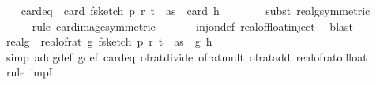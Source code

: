 \begin{isabellebody}
\isanewline
\ \ \isamarkupfalse%
\ card{\isacharunderscore}{\kern0pt}eq{\isacharcolon}{\kern0pt}\ {\isachardoublequoteopen}{\isasymAnd}{\isasymomega}{\isachardot}{\kern0pt}\ card\ {\isacharparenleft}{\kern0pt}f{}{\isacharunderscore}{\kern0pt}sketch\ p\ r\ t\ {\isasymomega}\ as{\isacharparenright}{\kern0pt}\ {\isacharequal}{\kern0pt}\ card\ {\isacharparenleft}{\kern0pt}h\ {\isasymomega}{\isacharparenright}{\kern0pt}{\isachardoublequoteclose}\ \isanewline
\ \ \ \ \isamarkupfalse%
\ {\isacharparenleft}{\kern0pt}subst\ real{\isacharunderscore}{\kern0pt}g{\isacharunderscore}{\kern0pt}{}{\isacharbrackleft}{\kern0pt}symmetric{\isacharbrackright}{\kern0pt}{\isacharparenright}{\kern0pt}\ \isanewline
\ \ \ \ \isamarkupfalse%
\ {\isacharparenleft}{\kern0pt}rule\ card{\isacharunderscore}{\kern0pt}image{\isacharbrackleft}{\kern0pt}symmetric{\isacharbrackright}{\kern0pt}{\isacharparenright}{\kern0pt}\ \isanewline
\ \ \ \ \isamarkupfalse%
\ inj{\isacharunderscore}{\kern0pt}on{\isacharunderscore}{\kern0pt}def\ real{\isacharunderscore}{\kern0pt}of{\isacharunderscore}{\kern0pt}float{\isacharunderscore}{\kern0pt}inject\ \isamarkupfalse%
\ blast\isanewline
\isanewline
\ \ \isamarkupfalse%
\ real{\isacharunderscore}{\kern0pt}g{\isacharcolon}{\kern0pt}\ {\isachardoublequoteopen}{\isasymAnd}{\isasymomega}{\isachardot}{\kern0pt}\ real{\isacharunderscore}{\kern0pt}of{\isacharunderscore}{\kern0pt}rat\ {\isacharparenleft}{\kern0pt}g\ {\isacharparenleft}{\kern0pt}f{}{\isacharunderscore}{\kern0pt}sketch\ p\ r\ t\ {\isasymomega}\ as{\isacharparenright}{\kern0pt}{\isacharparenright}{\kern0pt}\ {\isacharequal}{\kern0pt}\ g{\isacharprime}{\kern0pt}\ {\isacharparenleft}{\kern0pt}h\ {\isasymomega}{\isacharparenright}{\kern0pt}{\isachardoublequoteclose}\isanewline
\ \ \ \ \isamarkupfalse%
\ {\isacharparenleft}{\kern0pt}simp\ add{\isacharcolon}{\kern0pt}g{\isacharunderscore}{\kern0pt}def\ g{\isacharprime}{\kern0pt}{\isacharunderscore}{\kern0pt}def\ card{\isacharunderscore}{\kern0pt}eq\ of{\isacharunderscore}{\kern0pt}rat{\isacharunderscore}{\kern0pt}divide\ of{\isacharunderscore}{\kern0pt}rat{\isacharunderscore}{\kern0pt}mult\ of{\isacharunderscore}{\kern0pt}rat{\isacharunderscore}{\kern0pt}add\ real{\isacharunderscore}{\kern0pt}of{\isacharunderscore}{\kern0pt}rat{\isacharunderscore}{\kern0pt}of{\isacharunderscore}{\kern0pt}float{\isacharparenright}{\kern0pt}\isanewline
\ \ \ \ \isamarkupfalse%
\ {\isacharparenleft}{\kern0pt}rule\ impI{\isacharparenright}{\kern0pt}\isanewline

\end{isabellebody}
